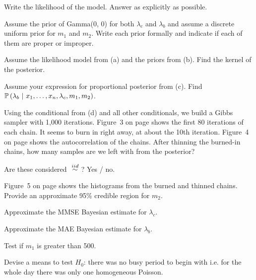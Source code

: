 \documentclass[12pt]{article}
\begin{document}
 Write the likelihood of the model. Answer as explicitly as possible. 

 Assume the prior of Gamma(0, 0) for both $\lambda_c$ and $\lambda_b$ and assume a discrete uniform prior for $m_1$ and $m_2$. Write each prior formally and indicate if each of them are proper or improper. 


 Assume the likelihood model from (a) and the priors from (b). Find the kernel of the posterior. 


 Assume your expression for proportional posterior from (c). Find $\mathbb{P}\left(\lambda_b~|~x_1, \ldots, x_n, \lambda_c, m_1, m_2\right)$. 

 Using the conditional from (d) and all other conditionals, we build a Gibbs sampler with 1,000 iterations. Figure~3 on page \pageref{fig:burn} shows the first 80 iterations of each chain. It seems to burn in right away, at about the 10th iteration. Figure~4 on page \pageref{fig:acf} shows the autocorrelation of the chains. After thinning the burned-in chains, how many samples are we left with from the posterior? 

 Are these  considered $\iid$? Yes / no.

 Figure~5 on page \pageref{fig:marginals} shows the histograms from the burned and thinned chains. Provide an approximate 95\% credible region for $m_2$.  

 Approximate the MMSE Bayesian estimate for $\lambda_c$.  

 Approximate the MAE Bayesian estimate for $\lambda_b$.  

 Test if $m_1$ is greater than 500.  

 Devise a means to test $H_0$: there was no busy period to begin with i.e. for the whole day there was only one homogeneous Poisson.

\eenum
\end{document}
